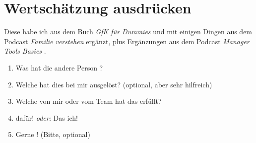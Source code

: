 \section{Wertschätzung ausdrücken}
\label{wertschaetzung}

Diese habe ich aus dem Buch \emph{GfK für Dummies} \cite[S.~206]{gfk-dummies} und mit einigen Dingen aus dem Podcast \emph{Familie verstehen} \cite{familie-verstehen-podcast} ergänzt, plus Ergänzungen aus dem Podcast \emph{Manager Tools Basics} \cite{manager-tools-basics}.

\begin{enumerate}
  \item Was hat die andere Person ?
  \item Welche  hat dies bei mir ausgelöst? (optional, aber sehr hilfreich)
  \item Welche  von mir oder vom Team hat das erfüllt?
  \item {} dafür! \emph{oder:} Das  ich!
  \item Gerne ! (Bitte, optional)
\end{enumerate}
